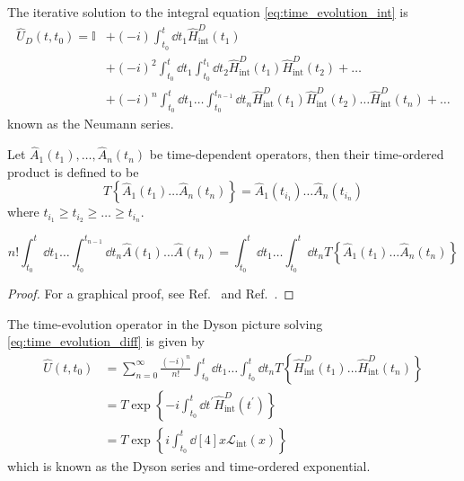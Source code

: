 \begin{lemma}\label{thm:time_evolution_iter_sol}
	The iterative solution to the integral equation \cref{eq:time_evolution_int} is
	\begin{equation}
		\begin{split}
			\hat{U}_D(t,t_0)
			=
			\mathbb{I}
			&+
			(-i)
			\int_{t_0}^t\dd{t_1}
			\hat{H}_\text{int}^D(t_1)
			\\
			&+
			(-i)^2
			\int_{t_0}^t\dd{t_1}
			\int_{t_0}^{t_1}\dd{t_2}
			\hat{H}_\text{int}^D(t_1)
			\hat{H}_\text{int}^D(t_2)
			+\dots
			\\
			&+
			(-i)^n
			\int_{t_0}^t\dd{t_1}
			\dots
			\int_{t_0}^{t_{n-1}}\dd{t_n}
			\hat{H}_\text{int}^D(t_1)
			\hat{H}_\text{int}^D(t_2)
			\dots
			\hat{H}_\text{int}^D(t_n)
			+\dots
		\end{split}
	\end{equation}
	known as the Neumann series.
\end{lemma}
\begin{definition}
	Let $\hat{A}_1(t_1),\dots,\hat{A}_n(t_n)$ be time-dependent operators, then their time-ordered product is defined to be
	\begin{equation}
		T\left\{
			\hat{A}_1(t_1)
			\dots
			\hat{A}_n(t_n)
		\right\}
		=
		\hat{A}_1(t_{i_1})
		\dots
		\hat{A}_n(t_{i_n})
	\end{equation}
	where $t_{i_1}\geq t_{i_2}\geq\dots\geq t_{i_n}$.
\end{definition}
\begin{lemma}\label{thm:time_ordered_integral}
	\begin{equation}
		n!
		\int_{t_0}^t\dd{t_1}
		\dots
		\int_{t_0}^{t_{n-1}}\dd{t_n}
		\hat{A}(t_1)
		\dots
		\hat{A}(t_n)
		=
		\int_{t_0}^t\dd{t_1}
		\dots
		\int_{t_0}^t\dd{t_n}
		T\left\{
			\hat{A}_1(t_1)
			\dots
			\hat{A}_n(t_n)
		\right\}
	\end{equation}
\end{lemma}
\begin{proof}
	For a graphical proof, see Ref.~\cite[p.~218]{Greiner2013} and Ref.~\cite[p.~85]{Peskin1995}.
\end{proof}
\begin{theorem}\label{thm:time_evolution_exp_sol}
	The time-evolution operator in the Dyson picture solving \cref{eq:time_evolution_diff} is given by
	\begin{equation}
		\begin{split}
			\hat{U}(t,t_0)
			&=
			\sum_{n=0}^\infty
			\frac{(-i)^n}{n!}
			\int_{t_0}^t\dd{t_1}
			\dots
			\int_{t_0}^t\dd{t_n}
			T\left\{
				\hat{H}^D_\text{int}(t_1)
				\dots
				\hat{H}^D_\text{int}(t_n)
			\right\}
			\\
			&=
			T\exp\left\{
				-i
				\int_{t_0}^t
				\dd{t^\prime}
				\hat{H}^D_\text{int}(t^\prime)
			\right\}
			\\
			&=
			T\exp\left\{
				i
				\int_{t_0}^t
				\dd[4]{x}
				\mathcal{L}_\text{int}(x)
			\right\}			
		\end{split}
		\label{eq:time_evolution_sol}
	\end{equation}
	which is known as the Dyson series and time-ordered exponential.
\end{theorem}

